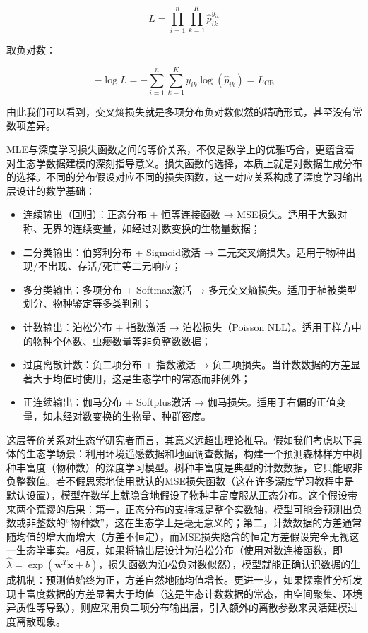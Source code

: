 \documentclass[
  twoside,12pt,fontset=none]{ctexbook}
\providecommand{\tightlist}{%
  \setlength{\itemsep}{0pt}\setlength{\parskip}{0pt}}
\begin{document}
\[L = \prod_{i=1}^{n} \prod_{k=1}^{K} \hat{p}_{ik}^{y_{ik}}\]

取负对数：

\[-\log L = -\sum_{i=1}^{n} \sum_{k=1}^{K} y_{ik} \log(\hat{p}_{ik}) = L_{\text{CE}}\]

由此我们可以看到，交叉熵损失就是多项分布负对数似然的精确形式，甚至没有常数项差异。

MLE与深度学习损失函数之间的等价关系，不仅是数学上的优雅巧合，更蕴含着对生态学数据建模的深刻指导意义。损失函数的选择，本质上就是对数据生成分布的选择。不同的分布假设对应不同的损失函数，这一对应关系构成了深度学习输出层设计的数学基础：

\begin{itemize}
\tightlist
\item
  连续输出（回归）：正态分布 + 恒等连接函数 → MSE损失。适用于大致对称、无界的连续变量，如经过对数变换的生物量数据；
\item
  二分类输出：伯努利分布 + Sigmoid激活 → 二元交叉熵损失。适用于物种出现/不出现、存活/死亡等二元响应；
\item
  多分类输出：多项分布 + Softmax激活 → 多元交叉熵损失。适用于植被类型划分、物种鉴定等多类判别；
\item
  计数输出：泊松分布 + 指数激活 → 泊松损失（Poisson NLL）。适用于样方中的物种个体数、虫瘿数量等非负整数数据；
\item
  过度离散计数：负二项分布 + 指数激活 → 负二项损失。当计数数据的方差显著大于均值时使用，这是生态学中的常态而非例外；
\item
  正连续输出：伽马分布 + Softplus激活 → 伽马损失。适用于右偏的正值变量，如未经对数变换的生物量、种群密度。
\end{itemize}

这层等价关系对生态学研究者而言，其意义远超出理论推导。假如我们考虑以下具体的生态学场景：利用环境遥感数据和地面调查数据，构建一个预测森林样方中树种丰富度（物种数）的深度学习模型。树种丰富度是典型的计数数据，它只能取非负整数值。若不假思索地使用默认的MSE损失函数（这在许多深度学习教程中是默认设置），模型在数学上就隐含地假设了物种丰富度服从正态分布。这个假设带来两个荒谬的后果：第一，正态分布的支持域是整个实数轴，模型可能会预测出负数或非整数的``物种数''，这在生态学上是毫无意义的；第二，计数数据的方差通常随均值的增大而增大（方差不恒定），而MSE损失隐含的恒定方差假设完全无视这一生态学事实。相反，如果将输出层设计为泊松分布（使用对数连接函数，即 \(\hat{\lambda} = \exp(\mathbf{w}^T\mathbf{x} + b)\)，损失函数为泊松负对数似然），模型就能正确认识数据的生成机制：预测值始终为正，方差自然地随均值增长。更进一步，如果探索性分析发现丰富度数据的方差显著大于均值（这是生态计数数据的常态，由空间聚集、环境异质性等导致），则应采用负二项分布输出层，引入额外的离散参数来灵活建模过度离散现象。
\end{document}
